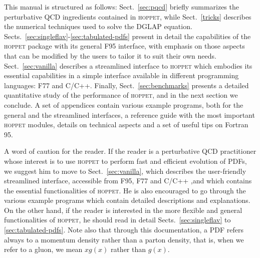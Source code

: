 \documentclass[12pt]{article}
\newcommand{\hoppet}{\textsc{hoppet}\xspace}
\begin{document}
This manual is structured as follows: Sect.~\ref{sec:pqcd}
briefly summarizes the perturbative QCD ingredients contained in
\hoppet, while Sect.~\ref{tricks} describes the numerical techniques
used to solve the DGLAP equation. 
Sects.~\ref{sec:singleflav}-\ref{sec:tabulated-pdfs} present in detail the capabilities
of the \hoppet package with its general F95 interface, 
with emphasis on those aspects that
can be modified by the users to tailor it to suit their own needs. 
Sect.~\ref{sec:vanilla} describes a streamlined interface
to \hoppet which embodies its essential capabilities in
a simple interface available in different programming languages: 
F77 and C/C++.
Finally, Sect.~\ref{sec:benchmarks} presents a detailed 
quantitative study of
the performance of \hoppet, and in the next section we conclude.
A set of appendices contain various example programs,
both for the general and the streamlined interfaces, a reference
guide with the most important \hoppet modules,
details on technical aspects and a set of useful tips on
Fortran 95. 


A word of caution for the reader. If the reader is a perturbative
QCD practitioner whose interest is to use \hoppet to perform
fast and efficient evolution of PDFs, we suggest him to move
to Sect.~\ref{sec:vanilla}, which describes the 
user-friendly streamlined interface,
accessible from F95, F77 and C/C++ ,and which contains the essential
functionalities of \hoppet. He is also encouraged to go through the
various example programs which contain detailed 
descriptions and explanations. 
On the other hand, if the reader is interested in the
more flexible and general 
functionalities of \hoppet, he should read in detail
Sects.~\ref{sec:singleflav} to \ref{sec:tabulated-pdfs}. Note also
that through this documentation, a PDF refers always to a momentum
density rather than a parton density, that is, when we refer to
a gluon, we mean $xg(x)$ rather than $g(x)$.


\end{document}
